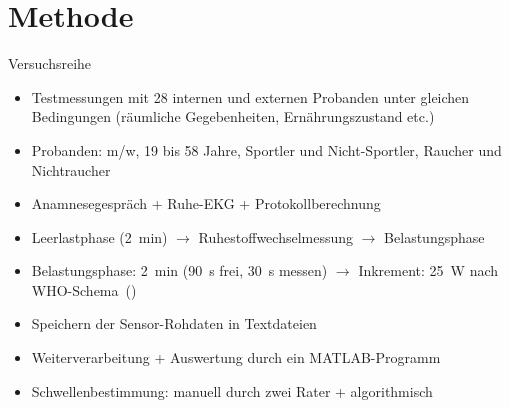 \documentclass[colorBG,slideColor,8pt]{beamer}
\begin{document}
\section{Methode}

\begin{frame}{Versuchsreihe}
\begin{itemize}
	\item Testmessungen mit 28 internen und externen Probanden unter gleichen Bedingungen (räumliche Gegebenheiten, Ernährungszustand etc.)
	\item Probanden: m/w, 19 bis 58 Jahre, Sportler und Nicht-Sportler, Raucher und Nichtraucher
	\item Anamnesegespräch + Ruhe-EKG + Protokollberechnung
	\item Leerlastphase (\SI{2}{\minute}) $\rightarrow$ Ruhestoffwechselmessung $\rightarrow$ Belastungsphase
	\item Belastungsphase: \SI{2}{\minute} (\SI{90}{\second} frei, \SI{30}{\second} messen) $\rightarrow$ Inkrement: \SI{25}{\watt} nach WHO-Schema~(\cite{Trappe.2000})
	\item Speichern der Sensor-Rohdaten in Textdateien
	\item Weiterverarbeitung + Auswertung durch ein MATLAB-Programm
	\item Schwellenbestimmung: manuell durch zwei Rater + algorithmisch
\end{itemize}
\end{frame}
\end{document}

